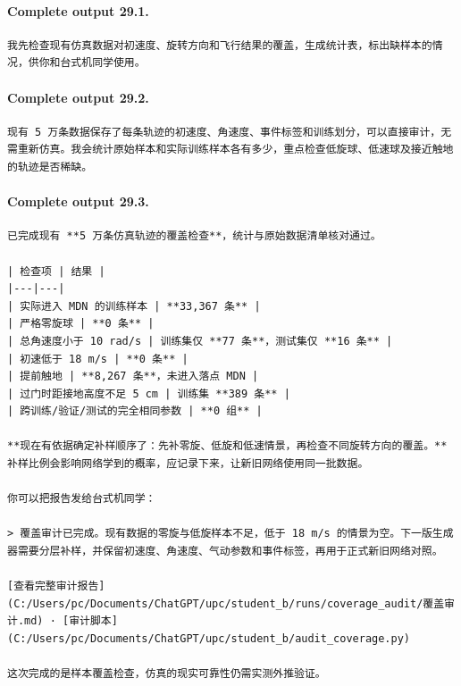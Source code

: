 \documentclass[UTF8,10pt]{ctexart}
\begin{document}
\paragraph{Complete output 29.1.}
\begin{Verbatim}[breaklines=true,breakanywhere=true,fontsize=\scriptsize,frame=single,framesep=2pt]
我先检查现有仿真数据对初速度、旋转方向和飞行结果的覆盖，生成统计表，标出缺样本的情况，供你和台式机同学使用。
\end{Verbatim}

\paragraph{Complete output 29.2.}
\begin{Verbatim}[breaklines=true,breakanywhere=true,fontsize=\scriptsize,frame=single,framesep=2pt]
现有 5 万条数据保存了每条轨迹的初速度、角速度、事件标签和训练划分，可以直接审计，无需重新仿真。我会统计原始样本和实际训练样本各有多少，重点检查低旋球、低速球及接近触地的轨迹是否稀缺。
\end{Verbatim}

\paragraph{Complete output 29.3.}
\begin{Verbatim}[breaklines=true,breakanywhere=true,fontsize=\scriptsize,frame=single,framesep=2pt]
已完成现有 **5 万条仿真轨迹的覆盖检查**，统计与原始数据清单核对通过。

| 检查项 | 结果 |
|---|---|
| 实际进入 MDN 的训练样本 | **33,367 条** |
| 严格零旋球 | **0 条** |
| 总角速度小于 10 rad/s | 训练集仅 **77 条**，测试集仅 **16 条** |
| 初速低于 18 m/s | **0 条** |
| 提前触地 | **8,267 条**，未进入落点 MDN |
| 过门时距接地高度不足 5 cm | 训练集 **389 条** |
| 跨训练/验证/测试的完全相同参数 | **0 组** |

**现在有依据确定补样顺序了：先补零旋、低旋和低速情景，再检查不同旋转方向的覆盖。** 补样比例会影响网络学到的概率，应记录下来，让新旧网络使用同一批数据。

你可以把报告发给台式机同学：

> 覆盖审计已完成。现有数据的零旋与低旋样本不足，低于 18 m/s 的情景为空。下一版生成器需要分层补样，并保留初速度、角速度、气动参数和事件标签，再用于正式新旧网络对照。

[查看完整审计报告](C:/Users/pc/Documents/ChatGPT/upc/student_b/runs/coverage_audit/覆盖审计.md) · [审计脚本](C:/Users/pc/Documents/ChatGPT/upc/student_b/audit_coverage.py)

这次完成的是样本覆盖检查，仿真的现实可靠性仍需实测外推验证。
\end{Verbatim}
\end{document}
